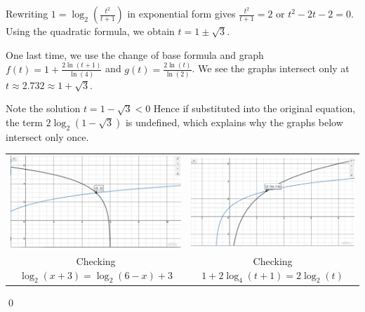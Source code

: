 \begin{ex}
\begin{enumerate}
Rewriting $1 = \log_{2}\left( \frac{t^{2}}{t+1}\right)$ in exponential form gives  $ \frac{t^{2}}{t+1} = 2$ or $t^2 -2t-2 = 0$.  Using the quadratic formula, we obtain  $t = 1 \pm \sqrt{3}$.

One last time, we use the change of base formula and graph  $f(t) = 1 + \frac{2\ln(t+1)}{\ln(4)}$ and $g(t) = \frac{2 \ln(t)}{\ln(2)}$.   We see the graphs intersect only at $t \approx 2.732 \approx 1 + \sqrt{3}$.  

\smallskip

Note the solution $t = 1 - \sqrt{3} < 0$ Hence if substituted into the original equation, the term $2 \log_{2}\left(1 - \sqrt{3}\right)$ is undefined, which explains why the graphs below intersect only once.

\begin{center}

\begin{tabular}{cc}

\includegraphics[width=3in]{./LogarithmicEquationsandInequalitiesGraphics/LogEqnEx05.jpg} &

\includegraphics[width=3in]{./LogarithmicEquationsandInequalitiesGraphics/LogEqnEx06.jpg}  \\

Checking $\log_{2}(x+3) = \log_{2}(6-x)+3$
 
 &
 
 Checking $1 + 2 \log_{4}(t+1) = 2 \log_{2}(t)$
 
\end{tabular}

\end{center}
\end{enumerate}

\qed
\end{ex}

